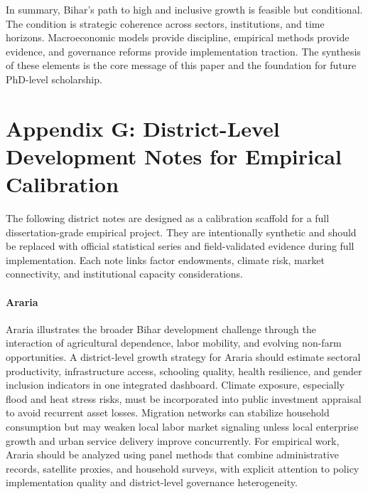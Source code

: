 \documentclass[preprint,12pt]{elsarticle}
\begin{document}
In summary, Bihar's path to high and inclusive growth is feasible but conditional. The condition is strategic coherence across sectors, institutions, and time horizons. Macroeconomic models provide discipline, empirical methods provide evidence, and governance reforms provide implementation traction. The synthesis of these elements is the core message of this paper and the foundation for future PhD-level scholarship.

\section{Appendix G: District-Level Development Notes for Empirical Calibration}

The following district notes are designed as a calibration scaffold for a full dissertation-grade empirical project. They are intentionally synthetic and should be replaced with official statistical series and field-validated evidence during full implementation. Each note links factor endowments, climate risk, market connectivity, and institutional capacity considerations.

\paragraph{Araria} Araria illustrates the broader Bihar development challenge through the interaction of agricultural dependence, labor mobility, and evolving non-farm opportunities. A district-level growth strategy for Araria should estimate sectoral productivity, infrastructure access, schooling quality, health resilience, and gender inclusion indicators in one integrated dashboard. Climate exposure, especially flood and heat stress risks, must be incorporated into public investment appraisal to avoid recurrent asset losses. Migration networks can stabilize household consumption but may weaken local labor market signaling unless local enterprise growth and urban service delivery improve concurrently. For empirical work, Araria should be analyzed using panel methods that combine administrative records, satellite proxies, and household surveys, with explicit attention to policy implementation quality and district-level governance heterogeneity.
\end{document}
